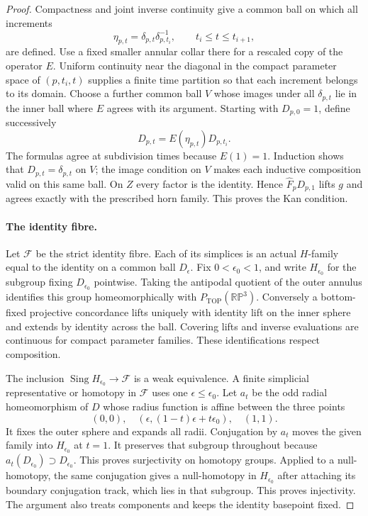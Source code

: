 \begin{proof}
Compactness and joint inverse continuity give a common
ball on which all increments
\[
 \eta_{p,t}=\delta_{p,t}\delta_{p,t_i}^{-1},
                       \qquad t_i\leq t\leq t_{i+1},
\]
are defined.  Use a fixed smaller annular collar there
for a rescaled copy of the operator $E$.
Uniform continuity near the diagonal in the compact
parameter space of $(p,t_i,t)$ supplies a finite time
partition so that each increment belongs to its domain.
Choose a further common ball $V$ whose images under all
$\delta_{p,t}$ lie in the inner ball where $E$ agrees
with its argument.  Starting with $D_{p,0}=1$, define
successively
\[
             D_{p,t}=E(\eta_{p,t})D_{p,t_i}.
\]
The formulas agree at subdivision times because $E(1)=1$.
Induction shows that $D_{p,t}=\delta_{p,t}$ on $V$;
the image condition on $V$ makes each inductive composition
valid on this same ball.  On $Z$ every factor is the
identity.  Hence $\widehat F_pD_{p,1}$ lifts $g$ and
agrees exactly with the prescribed horn family.
This proves the Kan condition.

\paragraph{The identity fibre.}
Let $\mathcal F$ be the strict identity fibre.  Each of
its simplices is an actual $H$-family equal to the
identity on a common ball $D_\epsilon$.  Fix
$0<\epsilon_0<1$, and write $H_{\epsilon_0}$ for the
subgroup fixing $D_{\epsilon_0}$ pointwise.  Taking
the antipodal quotient of the outer annulus identifies
this group homeomorphically with
$P_{\mathrm{TOP}}(\mathbb{RP}^3)$.
Conversely a bottom-fixed projective concordance lifts
uniquely with identity lift on the inner sphere and
extends by identity across the ball.  Covering lifts
and inverse evaluations are continuous for compact
parameter families.  These identifications respect
composition.

The inclusion $\operatorname{Sing}H_{\epsilon_0}\to
\mathcal F$ is a weak equivalence.  A finite simplicial
representative or homotopy in $\mathcal F$ uses one
$\epsilon\leq\epsilon_0$.  Let $a_t$ be the odd radial
homeomorphism of $D$ whose radius function is affine
between the three points
\[
 (0,0),\quad
 (\epsilon,(1-t)\epsilon+t\epsilon_0),\quad(1,1).
\]
It fixes the outer sphere and expands all radii.
Conjugation by $a_t$ moves the given family into
$H_{\epsilon_0}$ at $t=1$.  It preserves that subgroup
throughout because $a_t(D_{\epsilon_0})\supset
D_{\epsilon_0}$.  This proves surjectivity on homotopy
groups.  Applied to a null-homotopy, the same conjugation
gives a null-homotopy in $H_{\epsilon_0}$ after attaching
its boundary conjugation track, which lies in that
subgroup.  This proves injectivity.  The argument also
treats components and keeps the identity basepoint fixed.


\end{proof}
